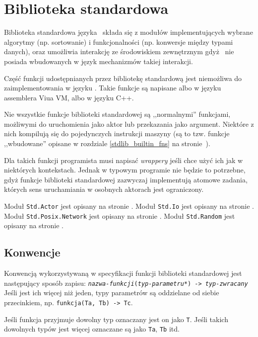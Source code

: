 \section{Biblioteka standardowa}

Biblioteka standardowa języka \ViuAct\ składa się z modułów implementujących
wybrane algorytmy (np. sortowanie) i funkcjonalności (np. konwersje między
typami danych), oraz umożliwia interakcję ze środowiskiem zewnętrznym gdyż
\ViuAct\ nie posiada wbudowanych w język mechanizmów takiej interakcji.

Część funkcji udostępnianych przez bibliotekę standardową jest niemożliwa do
zaimplementowania w języku \ViuAct. Takie funkcje są napisane albo w języku
assemblera Viua VM, albo w języku C++.

Nie wszystkie funkcje biblioteki standardowej są ,,normalnymi'' funkcjami,
możliwymi do uruchomienia jako aktor lub przekazania jako argument. Niektóre z
nich kompilują się do pojedynczych instrukcji maszyny (są to tzw. funkcje
,,wbudowane'' opisane w rozdziale \ref{stdlib_builtin_fns} na
stronie~\pageref{stdlib_builtin_fns}).

Dla takich funkcji programista musi napisać \emph{wrappery} jeśli chce użyć ich jak w niektórych kontekstach.
Jednak w typowym programie nie będzie to potrzebne, gdyż funkcje biblioteki standardowej zazwyczaj
implementują atomowe zadania, których sens uruchamiania w osobnych aktorach jest ograniczony.

Moduł \texttt{Std.Actor} jest opisany na stronie \pageref{stdlib_Std_Actor}.
Moduł \texttt{Std.Io} jest opisany na stronie \pageref{stdlib_Std_Io}.
Moduł \texttt{Std.Posix.Network} jest opisany na stronie \pageref{stdlib_Std_Posix_Network}.
Moduł \texttt{Std.Random} jest opisany na stronie \pageref{stdlib_Std_Random}.

\subsection*{Konwencje}

Konwencją wykorzystywaną w specyfikacji funkcji biblioteki standardowej jest
następujący sposób zapisu:
\texttt{\emph{nazwa-funkcji}(\emph{typ-parametru}*) -> \emph{typ-zwracany}}
Jeśli jest ich więcej niż jeden, typy parametrów są oddzielane od siebie
przecinkiem, np.
\texttt{funkcja(Ta, Tb) -> Tc}.

Jeśli funkcja przyjmuje dowolny typ oznaczany jest on jako \texttt{T}. Jeśli
takich dowolnych typów jest więcej oznaczane są jako \texttt{Ta}, \texttt{Tb}
itd.


